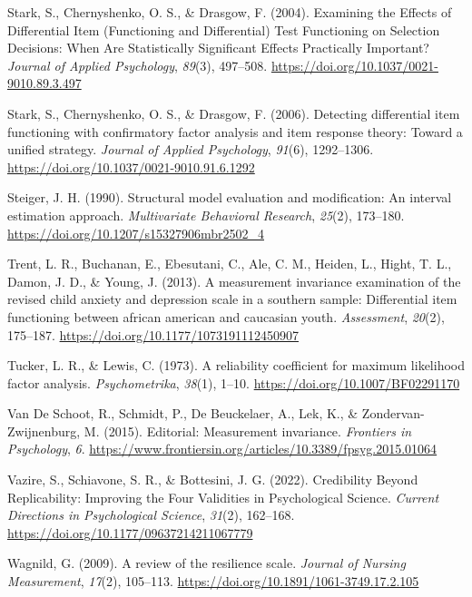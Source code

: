 \documentclass[
  man,floatsintext]{apa7}
\newlength{\cslhangindent}
\newenvironment{CSLReferences}[2] %
 {\begin{list}{}{%
  \setlength{\itemindent}{0pt}
  \setlength{\leftmargin}{0pt}
  \setlength{\parsep}{0pt}
  \ifodd #1
   \setlength{\leftmargin}{\cslhangindent}
   \setlength{\itemindent}{-1\cslhangindent}
  \fi
  \setlength{\itemsep}{#2\baselineskip}}}
 {\end{list}}
\begin{document}
\begin{CSLReferences}{1}{0}
Stark, S., Chernyshenko, O. S., \& Drasgow, F. (2004). Examining the Effects of Differential Item (Functioning and Differential) Test Functioning on Selection Decisions: When Are Statistically Significant Effects Practically Important? \emph{Journal of Applied Psychology}, \emph{89}(3), 497--508. \url{https://doi.org/10.1037/0021-9010.89.3.497}

Stark, S., Chernyshenko, O. S., \& Drasgow, F. (2006). Detecting differential item functioning with confirmatory factor analysis and item response theory: Toward a unified strategy. \emph{Journal of Applied Psychology}, \emph{91}(6), 1292--1306. \url{https://doi.org/10.1037/0021-9010.91.6.1292}

Steiger, J. H. (1990). Structural model evaluation and modification: An interval estimation approach. \emph{Multivariate Behavioral Research}, \emph{25}(2), 173--180. \url{https://doi.org/10.1207/s15327906mbr2502_4}

Trent, L. R., Buchanan, E., Ebesutani, C., Ale, C. M., Heiden, L., Hight, T. L., Damon, J. D., \& Young, J. (2013). A measurement invariance examination of the revised child anxiety and depression scale in a southern sample: Differential item functioning between african american and caucasian youth. \emph{Assessment}, \emph{20}(2), 175--187. \url{https://doi.org/10.1177/1073191112450907}

Tucker, L. R., \& Lewis, C. (1973). A reliability coefficient for maximum likelihood factor analysis. \emph{Psychometrika}, \emph{38}(1), 1--10. \url{https://doi.org/10.1007/BF02291170}

Van De Schoot, R., Schmidt, P., De Beuckelaer, A., Lek, K., \& Zondervan-Zwijnenburg, M. (2015). Editorial: Measurement invariance. \emph{Frontiers in Psychology}, \emph{6}. \url{https://www.frontiersin.org/articles/10.3389/fpsyg.2015.01064}

Vazire, S., Schiavone, S. R., \& Bottesini, J. G. (2022). Credibility Beyond Replicability: Improving the Four Validities in Psychological Science. \emph{Current Directions in Psychological Science}, \emph{31}(2), 162--168. \url{https://doi.org/10.1177/09637214211067779}

Wagnild, G. (2009). A review of the resilience scale. \emph{Journal of Nursing Measurement}, \emph{17}(2), 105--113. \url{https://doi.org/10.1891/1061-3749.17.2.105}


\end{CSLReferences}
\end{document}
